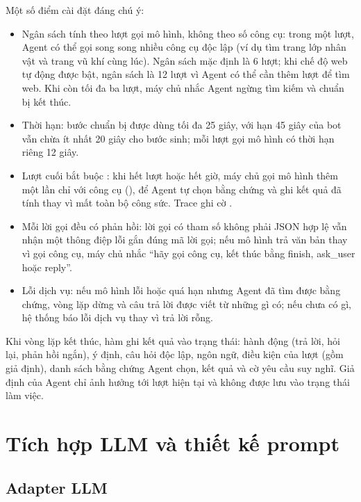 Một số điểm cài đặt đáng chú ý:
\begin{itemize}
    \item Ngân sách tính theo lượt gọi mô hình, không theo số công cụ: trong một lượt, Agent có thể gọi song song nhiều công cụ độc lập (ví dụ tìm trang lớp nhân vật và trang vũ khí cùng lúc). Ngân sách mặc định là 6 lượt; khi chế độ web tự động được bật, ngân sách là 12 lượt vì Agent có thể cần thêm lượt để tìm web. Khi còn tối đa ba lượt, máy chủ nhắc Agent ngừng tìm kiếm và chuẩn bị kết thúc.
    \item Thời hạn: bước chuẩn bị được dùng tối đa 25 giây, với hạn 45 giây của bot vẫn chừa ít nhất 20 giây cho bước sinh; mỗi lượt gọi mô hình có thời hạn riêng 12 giây.
    \item Lượt cuối bắt buộc : khi hết lượt hoặc hết giờ, máy chủ gọi mô hình thêm một lần chỉ với công cụ  (), để Agent tự chọn bằng chứng và ghi kết quả đã tính thay vì mất toàn bộ công sức. Trace ghi cờ .
    \item Mỗi lời gọi đều có phản hồi: lời gọi có tham số không phải JSON hợp lệ vẫn nhận một thông điệp lỗi gắn đúng mã lời gọi; nếu mô hình trả văn bản thay vì gọi công cụ, máy chủ nhắc ``hãy gọi công cụ, kết thúc bằng finish, ask\_user hoặc reply''.
    \item Lỗi dịch vụ: nếu mô hình lỗi hoặc quá hạn nhưng Agent đã tìm được bằng chứng, vòng lặp dừng và câu trả lời được viết từ những gì có; nếu chưa có gì, hệ thống báo lỗi dịch vụ thay vì trả lời rỗng.
\end{itemize}

Khi vòng lặp kết thúc, hàm ghi kết quả vào trạng thái: hành động (trả lời, hỏi lại, phản hồi ngắn), ý định, câu hỏi độc lập, ngôn ngữ, điều kiện của lượt (gồm giả định), danh sách bằng chứng Agent chọn, kết quả  và cờ yêu cầu suy nghĩ. Giả định của Agent chỉ ảnh hưởng tới lượt hiện tại và không được lưu vào trạng thái làm việc.

\section{Tích hợp LLM và thiết kế prompt}
\label{sec:impl_llm}

\subsection{Adapter LLM}
\label{sec:llm_adapter}

